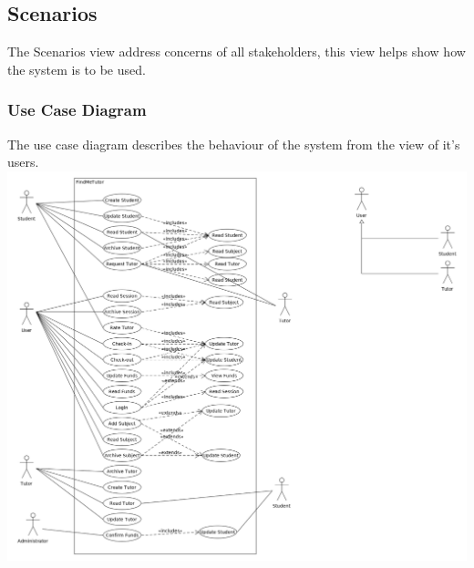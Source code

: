 \documentclass[12pt]{article}
\begin{document}
\newpage

\subsection{Scenarios}
The Scenarios view address concerns of all stakeholders, this view helps show how the system is to be used.
\subsubsection{Use Case Diagram}
The use case diagram describes the behaviour of the system from the view of it's users.\\
\includegraphics[width=170mm]{./Use_Case_Diagram.png}
\end{document}
